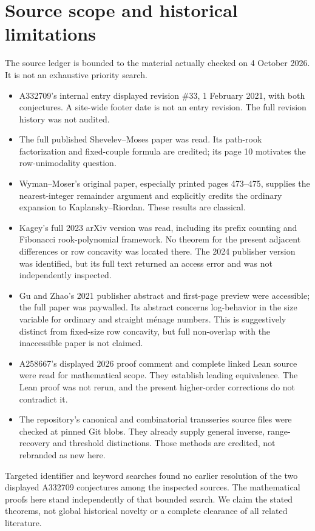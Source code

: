 \documentclass[11pt,letterpaper]{article}
\theoremstyle{remark}\newtheorem{remark}[theorem]{Remark}
\begin{document}
\section{Source scope and historical limitations}\label{fcm:sec:sources}
The source ledger is bounded to the material actually checked on 4 October 2026. It is not an exhaustive priority search.
\begin{itemize}[leftmargin=*]
\item A332709's internal entry displayed revision \#33, 1 February 2021, with both conjectures. A site-wide footer date is not an entry revision. The full revision history was not audited.
\item The full published Shevelev--Moses paper was read. Its path-rook factorization and fixed-couple formula are credited; its page 10 motivates the row-unimodality question.
\item Wyman--Moser's original paper, especially printed pages 473--475, supplies the nearest-integer remainder argument and explicitly credits the ordinary expansion to Kaplansky--Riordan. These results are classical.
\item Kagey's full 2023 arXiv version was read, including its prefix counting and Fibonacci rook-polynomial framework. No theorem for the present adjacent differences or row concavity was located there. The 2024 publisher version was identified, but its full text returned an access error and was not independently inspected.
\item Gu and Zhao's 2021 publisher abstract and first-page preview were accessible; the full paper was paywalled. Its abstract concerns log-behavior in the size variable for ordinary and straight m\'enage numbers. This is suggestively distinct from fixed-size row concavity, but full non-overlap with the inaccessible paper is not claimed.
\item A258667's displayed 2026 proof comment and complete linked Lean source were read for mathematical scope. They establish leading equivalence. The Lean proof was not rerun, and the present higher-order corrections do not contradict it.
\item The repository's canonical and combinatorial transseries source files were checked at pinned Git blobs. They already supply general inverse, range-recovery and threshold distinctions. Those methods are credited, not rebranded as new here.
\end{itemize}
Targeted identifier and keyword searches found no earlier resolution of the two displayed A332709 conjectures among the inspected sources. The mathematical proofs here stand independently of that bounded search. We claim the stated theorems, not global historical novelty or a complete clearance of all related literature.
\end{document}
